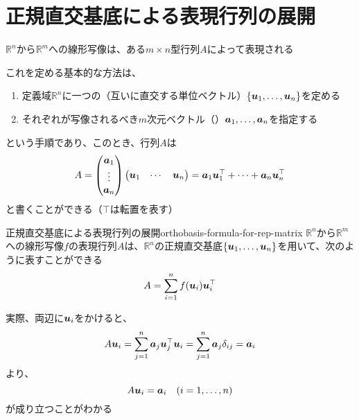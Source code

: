 \documentclass[../../../topic_linear-algebra]{subfiles}
\begin{document}
\sectionline
\section{正規直交基底による表現行列の展開}

$\mathbb{R}^n$から$\mathbb{R}^m$への線形写像は、ある$m \times n$型行列$A$によって表現される

\br

これを定める基本的な方法は、
\begin{enumerate}
  \item 定義域$\mathbb{R}^n$に一つの（互いに直交する単位ベクトル）$\{\vb*{u}_1,\ldots,\vb*{u}_n\}$を定める
  \item それぞれが写像されるべき$m$次元ベクトル（）$\vb*{a}_1,\ldots,\vb*{a}_n$を指定する
\end{enumerate}
という手順であり、このとき、行列$A$は
\begin{equation*}
  A = \begin{pmatrix}
    \vb*{a}_1 \\
    \vdots    \\
    \vb*{a}_n
  \end{pmatrix} \begin{pmatrix}
    \vb*{u}_1 & \cdots & \vb*{u}_n
  \end{pmatrix} = \vb*{a}_1 \vb*{u}_1^\top + \cdots + \vb*{a}_n \vb*{u}_n^\top
\end{equation*}
と書くことができる（$\top$は転置を表す）

\begin{theorem}{正規直交基底による表現行列の展開}{orthobasis-formula-for-rep-matrix}
  $\mathbb{R}^n$から$\mathbb{R}^m$への線形写像$f$の表現行列$A$は、$\mathbb{R}^n$の正規直交基底$\{\vb*{u}_1,\ldots,\vb*{u}_n\}$を用いて、次のように表すことができる
  \begin{equation*}
    A = \sum_{i=1}^n f(\vb*{u}_i) \vb*{u}_i^\top
  \end{equation*}
\end{theorem}

実際、両辺に$\vb*{u}_i$をかけると、
\begin{equation*}
  A \vb*{u}_i = \sum_{j=1}^n \vb*{a}_j \vb*{u}_j^\top \vb*{u}_i
  = \sum_{j=1}^n \vb*{a}_j \delta_{ij}
  = \vb*{a}_i
\end{equation*}
より、
\begin{equation*}
  A \vb*{u}_i = \vb*{a}_i \quad (i = 1, \ldots, n)
\end{equation*}
が成り立つことがわかる
\end{document}
